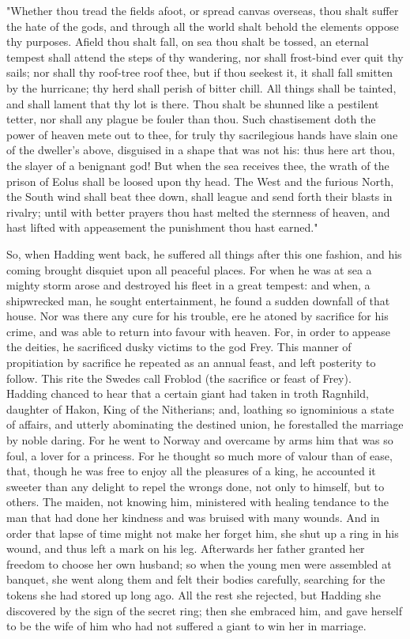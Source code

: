 \documentclass[10pt,a4paper]{report}
\begin{document}
"Whether thou tread the fields afoot, or spread canvas overseas, thou shalt suffer the hate of the gods, and through all the world shalt behold the elements oppose thy purposes. Afield thou shalt fall, on sea thou shalt be tossed, an eternal tempest shall attend the steps of thy wandering, nor shall frost-bind ever quit thy sails; nor shall thy roof-tree roof thee, but if thou seekest it, it shall fall smitten by the hurricane; thy herd shall perish of bitter chill. All things shall be tainted, and shall lament that thy lot is there. Thou shalt be shunned like a pestilent tetter, nor shall any plague be fouler than thou. Such chastisement doth the power of heaven mete out to thee, for truly thy sacrilegious hands have slain one of the dweller's above, disguised in a shape that was not his: thus here art thou, the slayer of a benignant god! But when the sea receives thee, the wrath of the prison of Eolus shall be loosed upon thy head. The West and the furious North, the South wind shall beat thee down, shall league and send forth their blasts in rivalry; until with better prayers thou hast melted the sternness of heaven, and hast lifted with appeasement the punishment thou hast earned."

So, when Hadding went back, he suffered all things after this one fashion, and his coming brought disquiet upon all peaceful places. For when he was at sea a mighty storm arose and destroyed his fleet in a great tempest: and when, a shipwrecked man, he sought entertainment, he found a sudden downfall of that house. Nor was there any cure for his trouble, ere he atoned by sacrifice for his crime, and was able to return into favour with heaven. For, in order to appease the deities, he sacrificed dusky victims to the god Frey. This manner of propitiation by sacrifice he repeated as an annual feast, and left posterity to follow. This rite the Swedes call Froblod (the sacrifice or feast of Frey).\\

Hadding chanced to hear that a certain giant had taken in troth Ragnhild, daughter of Hakon, King of the Nitherians; and, loathing so ignominious a state of affairs, and utterly abominating the destined union, he forestalled the marriage by noble daring. For he went to Norway and overcame by arms him that was so foul, a lover for a princess. For he thought so much more of valour than of ease, that, though he was free to enjoy all the pleasures of a king, he accounted it sweeter than any delight to repel the wrongs done, not only to himself, but to others. The maiden, not knowing him, ministered with healing tendance to the man that had done her kindness and was bruised with many wounds. And in order that lapse of time might not make her forget him, she shut up a ring in his wound, and thus left a mark on his leg. Afterwards her father granted her freedom to choose her own husband; so when the young men were assembled at banquet, she went along them and felt their bodies carefully, searching for the tokens she had stored up long ago. All the rest she rejected, but Hadding she discovered by the sign of the secret ring; then she embraced him, and gave herself to be the wife of him who had not suffered a giant to win her in marriage.\\
\end{document}
